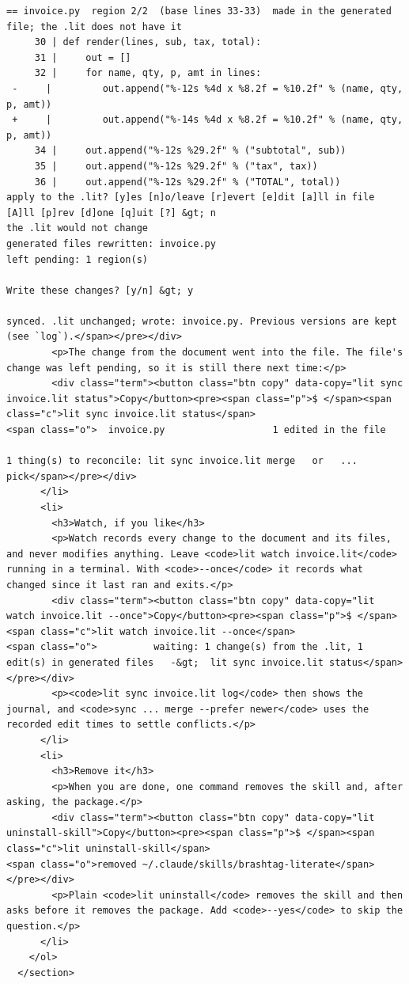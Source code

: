 \documentclass[10pt,a4paper]{article}
\begin{document}
\begin{Verbatim}
== invoice.py  region 2/2  (base lines 33-33)  made in the generated file; the .lit does not have it
     30 | def render(lines, sub, tax, total):
     31 |     out = []
     32 |     for name, qty, p, amt in lines:
 -     |         out.append("%-12s %4d x %8.2f = %10.2f" % (name, qty, p, amt))
 +     |         out.append("%-14s %4d x %8.2f = %10.2f" % (name, qty, p, amt))
     34 |     out.append("%-12s %29.2f" % ("subtotal", sub))
     35 |     out.append("%-12s %29.2f" % ("tax", tax))
     36 |     out.append("%-12s %29.2f" % ("TOTAL", total))
apply to the .lit? [y]es [n]o/leave [r]evert [e]dit [a]ll in file [A]ll [p]rev [d]one [q]uit [?] &gt; n
the .lit would not change
generated files rewritten: invoice.py
left pending: 1 region(s)

Write these changes? [y/n] &gt; y

synced. .lit unchanged; wrote: invoice.py. Previous versions are kept (see `log`).</span></pre></div>
        <p>The change from the document went into the file. The file's change was left pending, so it is still there next time:</p>
        <div class="term"><button class="btn copy" data-copy="lit sync invoice.lit status">Copy</button><pre><span class="p">$ </span><span class="c">lit sync invoice.lit status</span>
<span class="o">  invoice.py                   1 edited in the file

1 thing(s) to reconcile: lit sync invoice.lit merge   or   ... pick</span></pre></div>
      </li>
      <li>
        <h3>Watch, if you like</h3>
        <p>Watch records every change to the document and its files, and never modifies anything. Leave <code>lit watch invoice.lit</code> running in a terminal. With <code>--once</code> it records what changed since it last ran and exits.</p>
        <div class="term"><button class="btn copy" data-copy="lit watch invoice.lit --once">Copy</button><pre><span class="p">$ </span><span class="c">lit watch invoice.lit --once</span>
<span class="o">          waiting: 1 change(s) from the .lit, 1 edit(s) in generated files   -&gt;  lit sync invoice.lit status</span></pre></div>
        <p><code>lit sync invoice.lit log</code> then shows the journal, and <code>sync ... merge --prefer newer</code> uses the recorded edit times to settle conflicts.</p>
      </li>
      <li>
        <h3>Remove it</h3>
        <p>When you are done, one command removes the skill and, after asking, the package.</p>
        <div class="term"><button class="btn copy" data-copy="lit uninstall-skill">Copy</button><pre><span class="p">$ </span><span class="c">lit uninstall-skill</span>
<span class="o">removed ~/.claude/skills/brashtag-literate</span></pre></div>
        <p>Plain <code>lit uninstall</code> removes the skill and then asks before it removes the package. Add <code>--yes</code> to skip the question.</p>
      </li>
    </ol>
  </section>


\end{Verbatim}
\end{document}
